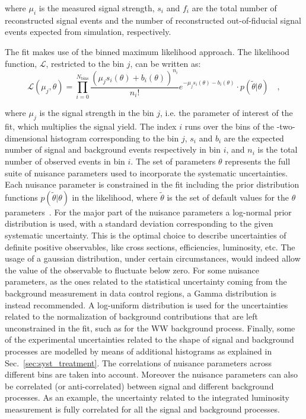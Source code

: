 \noindent where $\mu_i$ is the measured signal strength, $s_i$ and $f_i$ are the total number of reconstructed signal events and the number of reconstructed out-of-fiducial signal events expected from simulation, respectively.

The fit makes use of the binned maximum likelihood approach. The likelihood function, $\mathcal{L}$, restricted to the \pth bin $j$, can be written as:
\begin{equation}
\mathcal{L}(\mu_j,\theta) = \prod_{i=0}^{N_\mathrm{bins}} \frac{(\mu_j s_i(\theta) + b_i(\theta))^{n_i}}{n_i!}e^{-\mu_j s_i(\theta) - b_i(\theta)} \cdot p(\tilde{\theta} |\theta ) \quad ,
\end{equation}

\noindent where $\mu_j$ is the signal strength in the bin $j$, i.e. the parameter of interest of the fit, which multiplies the signal yield. The index $i$ runs over the bins of the \mll-\mt two-dimensional histogram corresponding to the \pth bin $j$, $s_i$ and $b_i$ are the expected number of signal and background events respectively in bin $i$, and $n_i$ is the total number of observed events in bin $i$. The set of parameters $\theta$ represents the full suite of nuisance parameters used to incorporate the systematic uncertainties. Each nuisance parameter is constrained in the fit including the prior distribution functions $p(\tilde{\theta}|\theta)$ in the likelihood, where $\tilde{\theta}$ is the set of default values for the $\theta$ parameters~\cite{CMS-NOTE-2011-005}. For the major part of the nuisance parameters a log-normal prior distribution is used, with a standard deviation corresponding to the given systematic uncertainty. This is the optimal choice to describe uncertainties of definite positive observables, like cross sections, efficiencies, luminosity, etc. The usage of a gaussian distribution, under certain circumstances, would indeed allow the value of the observable to fluctuate below zero.
For some nuisance parameters, as the ones related to the statistical uncertainty coming from the background measurement in data control regions, a Gamma distribution is instead recommended. 
A log-uniform distribution is used for the uncertainties related to the normalization of background contributions that are left unconstrained in the fit, such as for the WW background process.
Finally, some of the experimental uncertainties related to the shape of signal and background processes are modelled by means of additional histograms as explained in Sec.~\ref{sec:syst_treatment}. The correlations of nuisance parameters across different \pth bins are taken into account. Moreover the nuisance parameters can also be correlated (or anti-correlated) between signal and different background processes. As an example, the uncertainty related to the integrated luminosity measurement is fully correlated for all the signal and background processes.

